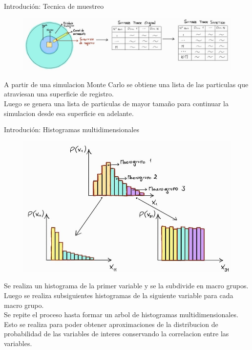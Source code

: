 \documentclass[aspectratio=169,english]{beamer}
\begin{document}
\begin{frame}{Introdución: Tecnica de muestreo}
    \begin{figure}
        \centering
        \includegraphics[width=0.95\linewidth]{imagens/esquema1.jpeg}
        \label{fig:esquema1}
    \end{figure}

    A partir de una simulacion Monte Carlo se obtiene una lista de las particulas que atraviesan una superficie de registro.\\
    \newline
    Luego se genera una lista de particulas de mayor tamaño para continuar la simulacion desde esa superficie en adelante.
\end{frame}

\begin{frame}{Introdución: Histogramas multidimensionales}
    \begin{figure}
        \centering
        \includegraphics[width=0.35\linewidth]{imagens/esquema2.jpeg}
        \label{fig:esquema2}
    \end{figure}

    Se realiza un histograma de la primer variable y se la subdivide en macro grupos. \\
    Luego se realiza subsiguientes histogramas de la siguiente variable para cada macro grupo. \\
    Se repite el proceso hasta formar un arbol de histogramas multidimensionales.\\
    \newline
    Esto se realiza para poder obtener aproximaciones de la distribucion de probabilidad de las variables de interes conservando la correlacion entre las variables.
\end{frame}
\end{document}
